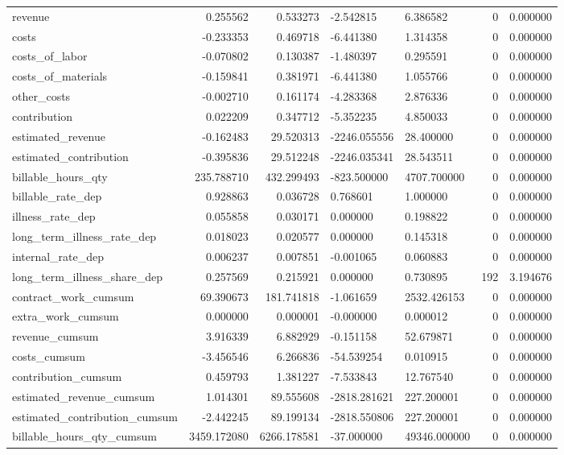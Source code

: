 \begin{landscape}
\begin{longtable}[h!]{lrrllrr}
revenue & 0.255562 & 0.533273 & -2.542815 & 6.386582 & 0 & 0.000000 \\
costs & -0.233353 & 0.469718 & -6.441380 & 1.314358 & 0 & 0.000000 \\
costs_of_labor & -0.070802 & 0.130387 & -1.480397 & 0.295591 & 0 & 0.000000 \\
costs_of_materials & -0.159841 & 0.381971 & -6.441380 & 1.055766 & 0 & 0.000000 \\
other_costs & -0.002710 & 0.161174 & -4.283368 & 2.876336 & 0 & 0.000000 \\
contribution & 0.022209 & 0.347712 & -5.352235 & 4.850033 & 0 & 0.000000 \\
estimated_revenue & -0.162483 & 29.520313 & -2246.055556 & 28.400000 & 0 & 0.000000 \\
estimated_contribution & -0.395836 & 29.512248 & -2246.035341 & 28.543511 & 0 & 0.000000 \\
billable_hours_qty & 235.788710 & 432.299493 & -823.500000 & 4707.700000 & 0 & 0.000000 \\
billable_rate_dep & 0.928863 & 0.036728 & 0.768601 & 1.000000 & 0 & 0.000000 \\
illness_rate_dep & 0.055858 & 0.030171 & 0.000000 & 0.198822 & 0 & 0.000000 \\
long_term_illness_rate_dep & 0.018023 & 0.020577 & 0.000000 & 0.145318 & 0 & 0.000000 \\
internal_rate_dep & 0.006237 & 0.007851 & -0.001065 & 0.060883 & 0 & 0.000000 \\
long_term_illness_share_dep & 0.257569 & 0.215921 & 0.000000 & 0.730895 & 192 & 3.194676 \\
contract_work_cumsum & 69.390673 & 181.741818 & -1.061659 & 2532.426153 & 0 & 0.000000 \\
extra_work_cumsum & 0.000000 & 0.000001 & -0.000000 & 0.000012 & 0 & 0.000000 \\
revenue_cumsum & 3.916339 & 6.882929 & -0.151158 & 52.679871 & 0 & 0.000000 \\
costs_cumsum & -3.456546 & 6.266836 & -54.539254 & 0.010915 & 0 & 0.000000 \\
contribution_cumsum & 0.459793 & 1.381227 & -7.533843 & 12.767540 & 0 & 0.000000 \\
estimated_revenue_cumsum & 1.014301 & 89.555608 & -2818.281621 & 227.200001 & 0 & 0.000000 \\
estimated_contribution_cumsum & -2.442245 & 89.199134 & -2818.550806 & 227.200001 & 0 & 0.000000 \\
billable_hours_qty_cumsum & 3459.172080 & 6266.178581 & -37.000000 & 49346.000000 & 0 & 0.000000 \\

\end{longtable}
\end{landscape}
